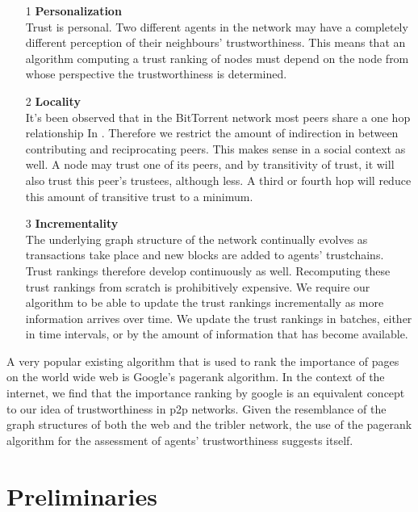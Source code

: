 \documentclass[twocolumn]{article}
\theoremstyle{definition}
\theoremstyle{theorem}
\begin{document}
\begin{itemize}
\item[1] {\bf Personalization} \\ Trust is personal. Two different agents in the network may have a completely different perception of their neighbours' trustworthiness. This means that an algorithm computing a trust ranking of nodes must depend on the node from whose perspective the trustworthiness is determined.
\item[2] {\bf Locality} \\ It's been observed that in the BitTorrent network most peers share a one hop relationship In \cite{One Hop Reputations for Peer to Peer File Sharing Workloads}. Therefore we restrict the amount of indirection in between contributing and reciprocating peers. This makes sense in a social context as well. A node may trust one of its peers, and by transitivity of trust, it will also trust this peer's trustees, although less. A third or fourth hop will reduce this amount of transitive trust to a minimum.
\item[3] {\bf Incrementality} \\
The underlying graph structure of the network continually evolves as transactions take place and new blocks are added to agents' trustchains. Trust rankings therefore develop continuously as well. Recomputing these trust rankings from scratch is prohibitively expensive. We require our algorithm to be able to update the trust rankings incrementally as more information arrives over time. We update the trust rankings in batches, either in time intervals, or by the amount of information that has become available. \vspace{1em}\\
\end{itemize}

\noindent A very popular existing algorithm that is used to rank the importance of pages on the world wide web is Google's pagerank algorithm. In the context of the internet, we find that the importance ranking by google is an equivalent concept to our idea of trustworthiness in p2p networks. Given the resemblance of the graph structures of both the web and the tribler network, the use of the pagerank algorithm for the assessment of agents' trustworthiness suggests itself.

\section{Preliminaries}
\label{sec:Preliminaries}
\end{document}
